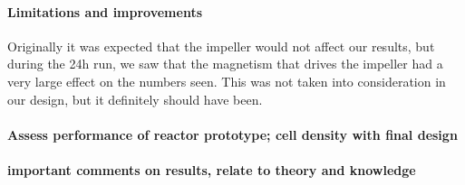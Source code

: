 \paragraph{Limitations and improvements}
Originally it was expected that the impeller would not affect our results, but during the 24h run, we saw that the magnetism that drives the impeller had a very large effect on the numbers seen.
This was not taken into consideration in our design, but it definitely should have been.

\paragraph{Assess performance of reactor prototype; cell density with final design}
\paragraph{important comments on results, relate to theory and knowledge}